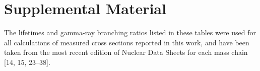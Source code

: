 \documentclass[a4paper,10pt]{article}
\title{}
\author{}
\begin{document}

% 


\section{Supplemental Material} \label{fe_supp_material}
% 
The   lifetimes and gamma-ray branching ratios  listed in these tables were used for all calculations of measured cross sections reported in this work, and have been taken from the most recent edition of  Nuclear Data Sheets for each  mass chain  [14, 15, 23--38].
\end{document}
